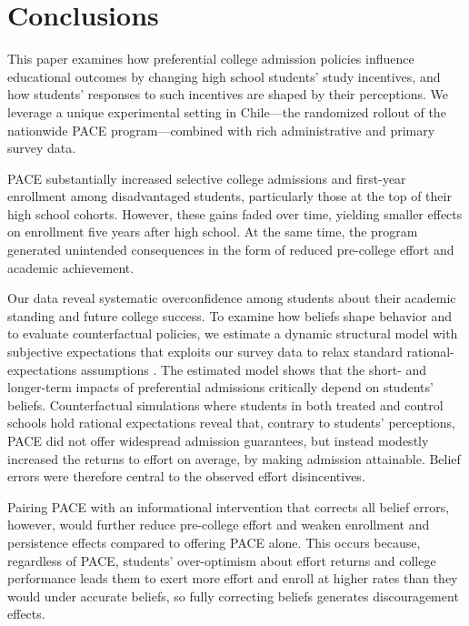 \section{Conclusions}
This paper examines how preferential college admission policies influence educational outcomes by changing high school students' study incentives, and how students' responses to such incentives are shaped by their perceptions. We leverage a unique experimental setting in Chile—the randomized rollout of the nationwide PACE program---combined with rich administrative and primary survey data. \par

PACE substantially increased selective college admissions and first-year enrollment among disadvantaged students, particularly those at the top of their high school cohorts. However, these gains faded over time, yielding smaller effects on enrollment five years after high school. At the same time, the program generated unintended consequences in the form of reduced pre-college effort and academic achievement.

Our data reveal systematic overconfidence among students about their academic standing and future college success. To examine how beliefs shape behavior and to evaluate counterfactual policies, we estimate a dynamic structural model with subjective expectations that exploits our survey data to relax standard rational-expectations assumptions \citep{manski2004measuring}. The estimated model shows that the short- and longer-term impacts of preferential admissions critically depend on students’ beliefs. Counterfactual simulations where students in both treated and control schools hold rational expectations reveal that, contrary to students’ perceptions, PACE did not offer widespread admission guarantees, but instead modestly increased the returns to effort on average, by making admission attainable. Belief errors were therefore central to the observed effort disincentives.\par




Pairing PACE with an informational intervention that corrects all belief errors, however, would further reduce pre-college effort and weaken enrollment and persistence effects compared to offering PACE alone. This occurs because, regardless of PACE, students’ over-optimism about effort returns and college performance leads them to exert more effort and enroll at higher rates than they would under accurate beliefs, so fully correcting beliefs generates discouragement effects.
\par 

